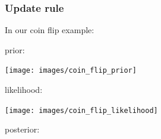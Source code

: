 \documentclass[t,aspectratio=169]{beamer}
\begin{document}
\begin{frame}
  \frametitle{Update rule}
  In our coin flip example:\\

  \begin{minipage}{0.15\textwidth}
    prior:
  \end{minipage}
  \begin{minipage}{0.4\textwidth}
  \end{minipage}
  \begin{minipage}{0.35\textwidth}
    \begin{adjustbox}{width=0.5\textwidth}
      \texttt{[image: images/coin\_flip\_prior]}
    \end{adjustbox}
  \end{minipage}
  
  \begin{minipage}{0.15\textwidth}
    likelihood:
  \end{minipage}
  \begin{minipage}{0.4\textwidth}
  \end{minipage}
  \begin{minipage}{0.35\textwidth}
    \begin{adjustbox}{width=0.5\textwidth}
      \texttt{[image: images/coin\_flip\_likelihood]}
    \end{adjustbox}
  \end{minipage}

  \begin{minipage}{0.15\textwidth}
    posterior:
  \end{minipage}
  \begin{minipage}{0.4\textwidth}
  \end{minipage}
  \begin{minipage}{0.35\textwidth}
  \end{minipage}
\end{frame}
\end{document}
